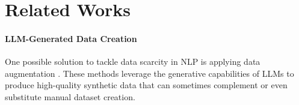 \section{Related Works}
\paragraph{LLM-Generated Data Creation} One possible solution to tackle data scarcity in NLP is applying data augmentation \citep{feng-etal-2021-survey, ding-etal-2020-daga, ahmed-buys-2024-neural, liu2024best, yong-etal-2024-lexc, guo2024generativeaisyntheticdata, liu-etal-2022-wanli}. These methods leverage the generative capabilities of LLMs to produce high-quality synthetic data that can sometimes complement or even substitute manual dataset creation.



